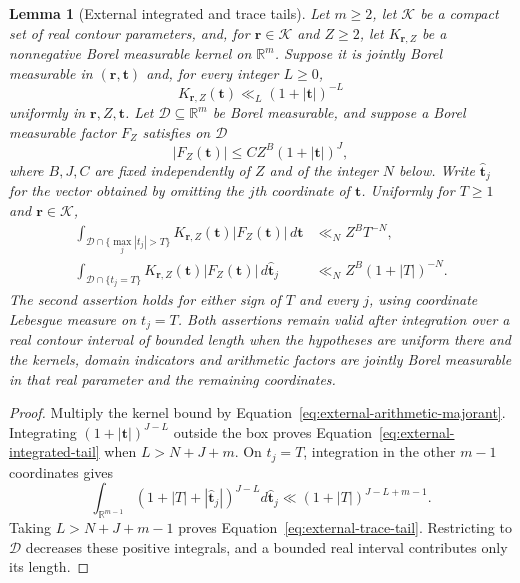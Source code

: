 \documentclass[11pt,a4paper]{article}
\numberwithin{equation}{section}
\numberwithin{figure}{section}
\newtheorem{lemma}[theorem]{Lemma}
\theoremstyle{definition}
\theoremstyle{remark}
\begin{document}
\begin{lemma}[External integrated and trace tails]
\label{lem:external-contour-tails}
Let $m\ge2$, let $\mathcal K$ be a compact set of real contour parameters,
and, for $\boldsymbol r\in\mathcal K$ and $Z\ge2$, let
$K_{\boldsymbol r,Z}$ be a nonnegative Borel measurable kernel on
$\mathbb R^m$.  Suppose it is jointly Borel measurable in
$(\boldsymbol r,\boldsymbol t)$ and, for every integer $L\ge0$,
\[
 K_{\boldsymbol r,Z}(\boldsymbol t)
 \ll_L(1+|\boldsymbol t|)^{-L}
\]
uniformly in $\boldsymbol r,Z,\boldsymbol t$.  Let
$\mathcal D\subseteq\mathbb R^m$ be Borel measurable, and suppose a Borel
measurable factor $F_Z$ satisfies on $\mathcal D$
\begin{equation}
 |F_Z(\boldsymbol t)|\le C Z^B(1+|\boldsymbol t|)^J,
 \label{eq:external-arithmetic-majorant}
\end{equation}
where $B,J,C$ are fixed independently of $Z$ and of the integer $N$ below.
Write $\widehat{\boldsymbol t}_j$ for the vector obtained by omitting the
$j$th coordinate of $\boldsymbol t$.  Uniformly for $T\ge1$ and
$\boldsymbol r\in\mathcal K$,
\begin{align}
 \int_{\mathcal D\cap\{\max_j|t_j|>T\}}
 K_{\boldsymbol r,Z}(\boldsymbol t)|F_Z(\boldsymbol t)|\,d\boldsymbol t
 &\ll_N Z^B T^{-N},
 \label{eq:external-integrated-tail}\\
 \int_{\mathcal D\cap\{t_j=T\}}
 K_{\boldsymbol r,Z}(\boldsymbol t)|F_Z(\boldsymbol t)|\,
 d\widehat{\boldsymbol t}_j
 &\ll_N Z^B(1+|T|)^{-N}.
 \label{eq:external-trace-tail}
\end{align}
The second assertion holds for either sign of $T$ and every $j$, using
coordinate Lebesgue measure on $t_j=T$.  Both assertions remain valid after
integration over a real contour interval of bounded length when the
hypotheses are uniform there and the kernels, domain indicators and
arithmetic factors are jointly Borel measurable in that real parameter and
the remaining coordinates.
\end{lemma}

\begin{proof}
Multiply the kernel bound by
Equation~\eqref{eq:external-arithmetic-majorant}.  Integrating
$(1+|\boldsymbol t|)^{J-L}$ outside the box proves
Equation~\eqref{eq:external-integrated-tail} when $L>N+J+m$.
On $t_j=T$, integration in the other $m-1$ coordinates gives
\[
 \int_{\mathbb R^{m-1}}
 (1+|T|+|\widehat{\boldsymbol t}_j|)^{J-L}
 d\widehat{\boldsymbol t}_j
 \ll(1+|T|)^{J-L+m-1}.
\]
Taking $L>N+J+m-1$ proves Equation~\eqref{eq:external-trace-tail}.
Restricting to $\mathcal D$ decreases these positive integrals, and a bounded
real interval contributes only its length.
\end{proof}
\end{document}
